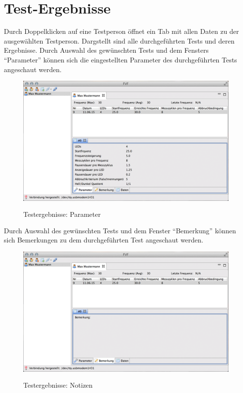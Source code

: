 \documentclass[11pt,accentcolor=tud2a,colorback,noheadingspace,bigchapter]{tudreport}
\begin{document}
\chapter{Test-Ergebnisse}
\label{results:test-ergebnisse}\label{results::doc}
Durch Doppelklicken auf eine Testperson öffnet ein Tab mit allen Daten zu der ausgewählten Testperson.
Dargstellt sind alle durchgeführten Tests und deren Ergebnisse. Durch Auswahl des gewünschten Tests und dem Fensters ``Parameter'' können sich die eingestellten Parameter des durchgeführten Tests angeschaut werden.

\begin{figure}[H]
	\centering
	\includegraphics[width=\textwidth]{results_parameter.png}
	\label{fig:results_parameters}
	\caption{Testergebnisse: Parameter}
\end{figure}


Durch Auswahl des gewünschten Tests und dem Fenster ``Bemerkung'' können sich Bemerkungen zu dem durchgeführten Test angeschaut werden.

\begin{figure}[H]
	\centering
	\includegraphics[width=\textwidth]{results_notes.png}
	\label{fig:results_notes}
	\caption{Testergebnisse: Notizen}
\end{figure}
\end{document}

